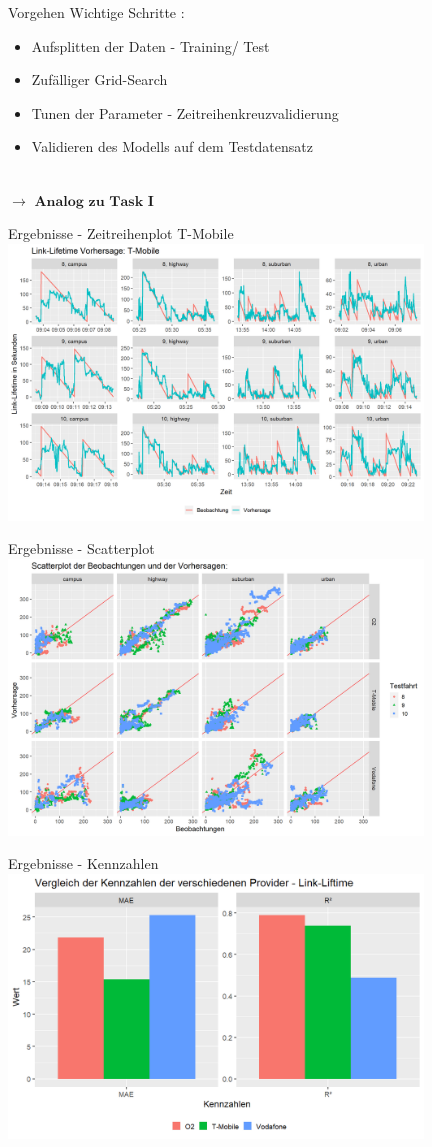 \begin{frame}{Vorgehen}
Wichtige Schritte : 
	\begin{itemize}
		\item Aufsplitten der Daten - Training/ Test
		\item Zufälliger Grid-Search
		\item Tunen der Parameter - Zeitreihenkreuzvalidierung
		\item Validieren des Modells auf dem Testdatensatz 
	\end{itemize}

\quad\\


$\rightarrow$ $\textbf{Analog zu Task I}$
\end{frame}

\begin{frame}{Ergebnisse - Zeitreihenplot T-Mobile}
\includegraphics[width = 11cm]{plots/link_lifetime/tmobile_predictions}
\end{frame}

\begin{frame}{Ergebnisse - Scatterplot}
\includegraphics[width = 11cm]{plots/link_lifetime/scatter_colored_axes_fixed}
\end{frame}


\begin{frame}{Ergebnisse - Kennzahlen}
\includegraphics[width = 11cm]{plots/link_lifetime/kennzahlen_linklifetime}
\end{frame}
